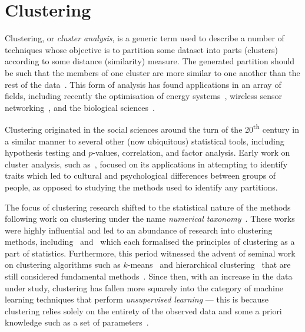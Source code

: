 
\section{Clustering}\label{sec:clustering}
\graphicspath{{chapters/lit/paper/img/clusters/}}

Clustering, or \emph{cluster analysis}, is a generic term used to describe a
number of techniques whose objective is to partition some dataset into parts
(clusters) according to some distance (similarity) measure. The generated
partition should be such that the members of one cluster are more similar to one
another than the rest of the data~\cite{Everitt2011}. This form of analysis has
found applications in an array of fields, including recently the optimisation
of energy systems~\cite{Jing2019,Teichgraeber2019}, wireless sensor
networking~\cite{Goswami2019}, and the biological
sciences~\cite{Bulut2020,Kiselev2019}.

Clustering originated in the social sciences around the turn of the
20\textsuperscript{th} century in a similar manner to several other (now
ubiquitous) statistical tools, including hypothesis testing and \(p\)-values,
correlation, and factor analysis. Early work on cluster analysis, such
as~\cite{Cattell1943,Driver1932}, focused on its applications in attempting to
identify traits which led to cultural and psychological differences between
groups of people, as opposed to studying the methods used to identify any
partitions.

The focus of clustering research shifted to the statistical nature of the
methods following work on clustering under the name \emph{numerical
taxonomy}~\cite{Sneath1973,Sokal1966}. These works were highly influential and
led to an abundance of research into clustering methods,
including~\cite{Diday1976} and~\cite{Hartigan1975} which each formalised the
principles of clustering as a part of statistics. Furthermore, this period
witnessed the advent of seminal work on clustering algorithms such as
\(k\)-means~\cite{Hartigan1979} and hierarchical
clustering~\cite{Defays1977,Sibson1973} that are still considered fundamental
methods~\cite{Aggarwal2013,Wu2009}. Since then, with an increase in the data
under study, clustering has fallen more squarely into the category of machine
learning techniques that perform \emph{unsupervised learning} --- this is
because clustering relies solely on the entirety of the observed data and some a
priori knowledge such as a set of parameters~\cite{Dayan1999}.

